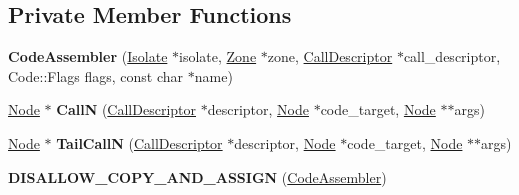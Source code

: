 \subsection*{Private Member Functions}
\begin{DoxyCompactItemize}
\item 
{\bfseries Code\+Assembler} (\hyperlink{classv8_1_1internal_1_1_isolate}{Isolate} $\ast$isolate, \hyperlink{classv8_1_1internal_1_1_zone}{Zone} $\ast$zone, \hyperlink{classv8_1_1internal_1_1compiler_1_1_call_descriptor}{Call\+Descriptor} $\ast$call\+\_\+descriptor, Code\+::\+Flags flags, const char $\ast$name)\hypertarget{classv8_1_1internal_1_1compiler_1_1_code_assembler_a39c92ac877ca1bba0ae22b2e87fd638f}{}\label{classv8_1_1internal_1_1compiler_1_1_code_assembler_a39c92ac877ca1bba0ae22b2e87fd638f}

\item 
\hyperlink{classv8_1_1internal_1_1compiler_1_1_node}{Node} $\ast$ {\bfseries CallN} (\hyperlink{classv8_1_1internal_1_1compiler_1_1_call_descriptor}{Call\+Descriptor} $\ast$descriptor, \hyperlink{classv8_1_1internal_1_1compiler_1_1_node}{Node} $\ast$code\+\_\+target, \hyperlink{classv8_1_1internal_1_1compiler_1_1_node}{Node} $\ast$$\ast$args)\hypertarget{classv8_1_1internal_1_1compiler_1_1_code_assembler_af248af11ffb0bc102669c5bdeeab4723}{}\label{classv8_1_1internal_1_1compiler_1_1_code_assembler_af248af11ffb0bc102669c5bdeeab4723}

\item 
\hyperlink{classv8_1_1internal_1_1compiler_1_1_node}{Node} $\ast$ {\bfseries Tail\+CallN} (\hyperlink{classv8_1_1internal_1_1compiler_1_1_call_descriptor}{Call\+Descriptor} $\ast$descriptor, \hyperlink{classv8_1_1internal_1_1compiler_1_1_node}{Node} $\ast$code\+\_\+target, \hyperlink{classv8_1_1internal_1_1compiler_1_1_node}{Node} $\ast$$\ast$args)\hypertarget{classv8_1_1internal_1_1compiler_1_1_code_assembler_a6ffc944a3207ff5bc6977905b226f01b}{}\label{classv8_1_1internal_1_1compiler_1_1_code_assembler_a6ffc944a3207ff5bc6977905b226f01b}

\item 
{\bfseries D\+I\+S\+A\+L\+L\+O\+W\+\_\+\+C\+O\+P\+Y\+\_\+\+A\+N\+D\+\_\+\+A\+S\+S\+I\+GN} (\hyperlink{classv8_1_1internal_1_1compiler_1_1_code_assembler}{Code\+Assembler})\hypertarget{classv8_1_1internal_1_1compiler_1_1_code_assembler_a4446fd897379e6c340a7a6eecc6ba80b}{}\label{classv8_1_1internal_1_1compiler_1_1_code_assembler_a4446fd897379e6c340a7a6eecc6ba80b}

\end{DoxyCompactItemize}
